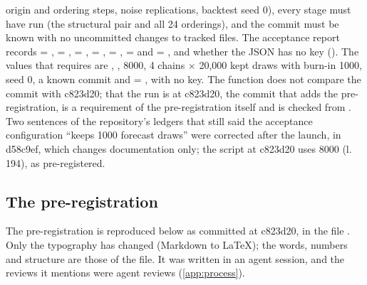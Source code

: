 origin and ordering steps, noise replications, backtest seed 0), every stage must have run (the
structural pair and all 24 orderings), and the commit must be known with no uncommitted changes to
tracked files.
The acceptance report records  = ,  =
,  = ,  =
,  = ,  =
 and  = , and whether the
JSON has no  key ().
The values that  requires are , , 8000,
4 chains $\times$ 20,000 kept draws with burn-in 1000, seed 0, a known commit and
 = , with no  key.
The function does not compare the commit with c823d20; that the run is at c823d20, the commit that
adds the pre-registration, is a requirement of the pre-registration itself and is checked from
.
Two sentences of the repository's ledgers that still said the acceptance configuration ``keeps 1000
forecast draws'' were corrected after the launch, in d58c9ef, which changes documentation only; the
script at c823d20 uses 8000 (l.\,194), as pre-registered.

\subsection{The pre-registration}\label{app:prereg}

The pre-registration is reproduced below as committed at c823d20, in the file
.
Only the typography has changed (Markdown to \LaTeX); the words, numbers and structure are those of
the file.
It was written in an agent session, and the reviews it mentions were agent reviews
(\cref{app:process}).

